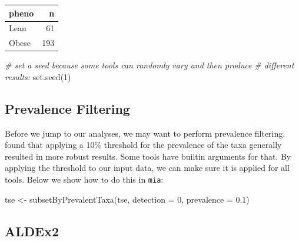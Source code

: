\documentclass[
]{book}
\newenvironment{Shaded}{\begin{snugshade}}{\end{snugshade}}
\newcommand{\AttributeTok}[1]{\textcolor[rgb]{0.77,0.63,0.00}{#1}}
\newcommand{\CommentTok}[1]{\textcolor[rgb]{0.56,0.35,0.01}{\textit{#1}}}
\newcommand{\DecValTok}[1]{\textcolor[rgb]{0.00,0.00,0.81}{#1}}
\newcommand{\FloatTok}[1]{\textcolor[rgb]{0.00,0.00,0.81}{#1}}
\newcommand{\FunctionTok}[1]{\textcolor[rgb]{0.00,0.00,0.00}{#1}}
\newcommand{\NormalTok}[1]{#1}
\newcommand{\OtherTok}[1]{\textcolor[rgb]{0.56,0.35,0.01}{#1}}
\begin{document}
\begin{tabular}{l|r}
\hline
pheno & n\\
\hline
Lean & 61\\
\hline
Obese & 193\\
\hline
\end{tabular}

\begin{Shaded}
\begin{Highlighting}[]
\CommentTok{\# set a seed because some tools can randomly vary and then produce }
\CommentTok{\# different results:}
\FunctionTok{set.seed}\NormalTok{(}\DecValTok{1}\NormalTok{)}
\end{Highlighting}
\end{Shaded}

\hypertarget{prevalence-filtering}{%
\subsection{Prevalence Filtering}\label{prevalence-filtering}}

Before we jump to our analyses, we may want to perform prevalence filtering.
\citet{nearingMicrobiomeDifferentialAbundance2021} found that applying a 10\% threshold for the prevalence of
the taxa generally resulted in more robust results. Some tools have builtin
arguments for that. By applying the threshold to our input data, we can make
sure it is applied for all tools. Below we show how to do this in \texttt{mia}:

\begin{Shaded}
\begin{Highlighting}[]
\NormalTok{tse }\OtherTok{\textless{}{-}} \FunctionTok{subsetByPrevalentTaxa}\NormalTok{(tse, }\AttributeTok{detection =} \DecValTok{0}\NormalTok{, }\AttributeTok{prevalence =} \FloatTok{0.1}\NormalTok{)}
\end{Highlighting}
\end{Shaded}

\hypertarget{aldex2}{%
\subsection{ALDEx2}\label{aldex2}}
\end{document}
